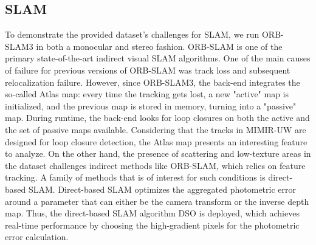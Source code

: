 \subsection{SLAM}
To demonstrate the provided dataset's challenges for SLAM, we run ORB-SLAM3 \cite{campos2021orb} in both a monocular and stereo fashion.
ORB-SLAM is one of the primary state-of-the-art indirect visual \ac{SLAM} algorithms. %
One of the main causes of failure for previous versions of ORB-SLAM was track loss and subsequent relocalization failure. However, since ORB-SLAM3, the back-end integrates the so-called Atlas map: every time the tracking gets lost, a new "active" map is initialized, and the previous map is stored in memory, turning into a "passive" map. During runtime, the back-end looks for loop closures on both the active and the set of passive maps available. %
Considering that the tracks in MIMIR-UW
are designed for loop closure detection, the Atlas map presents an interesting feature to analyze.
On the other hand, the presence of scattering and low-texture areas in the dataset challenges indirect methods like ORB-SLAM, which relies on feature tracking. A family of methods that is of interest for such conditions is direct-based SLAM. Direct-based SLAM optimizes the aggregated photometric error around a parameter that can either be the camera transform or the inverse depth map. %
Thus, the direct-based SLAM algorithm DSO \cite{engel2017dso} is deployed, which achieves real-time performance by choosing the high-gradient pixels for the photometric error calculation.




